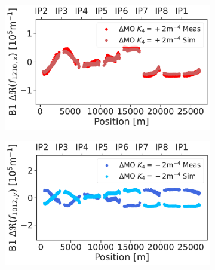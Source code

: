 \begin{figure}[!htb]
\begin{subfigure}{0.47\textwidth}
    \end{subfigure}
    \hfill
    \begin{subfigure}{0.47\textwidth}
        \includegraphics[width=\textwidth]{./images/skew_octupoles/responses_coupling/f1210_response_meas_sim_+2_REAL_smoll.pdf}
    \end{subfigure}
    \par\medskip 
    \begin{subfigure}{0.47\textwidth}
        \includegraphics[width=\textwidth]{./images/skew_octupoles/responses_coupling/f1012_response_meas_sim_-2_REAL_smoll.pdf}
    \end{subfigure}
    \hfill
    \begin{subfigure}{0.47\textwidth}

\end{subfigure}
\end{figure}
